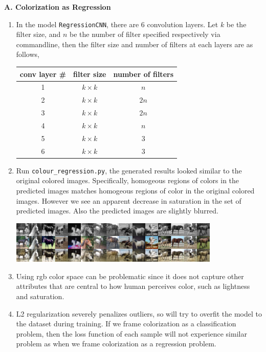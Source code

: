 \documentclass[11pt]{article}
\begin{document}
\textbf{A. Colorization as Regression}


\begin{enumerate}
    \item In the model \texttt{RegressionCNN}, there are 6 convolution layers. Let $k$ be the filter size, and $n$ be the number of filter specified respectively via commandline, then the filter size and number of filters at each layers are as follows,
    \begin{center}
        \begin{tabular}{ c | c c } 
            conv layer \# & filter size & number of filters \\ 
            \hline
            1 & $k\times k$ & $n$ \\
            2 & $k\times k$ & $2n$ \\ 
            3 & $k\times k$ & $2n$ \\ 
            4 & $k\times k$ & $n$ \\ 
            5 & $k\times k$ & $3$ \\
            6 & $k\times k$ & $3$ \\ 
           \end{tabular}
    \end{center}
    \item Run \texttt{colour\_regression.py}, the generated results looked similar to the original colored images. Specifically, homogeous regions of colors in the predicted images matches homogeous regions of color in the original colored images. However we see an apparent decrease in saturation in the set of predicted images. Also the predicted images are slightly blurred.
    \begin{center}
        \includegraphics[width=10cm]{regression_output.png}
    \end{center}
    \item Using rgb color space can be problematic since it does not capture other attributes that are central to how human perceives color, such as lightness and saturation. 
    \item L2 regularization severely penalizes outliers, so will try to overfit the model to the dataset during training. If we frame colorization as a classification problem, then the loss function of each sample will not experience similar problem as when we frame colorization as a regression problem. 
\end{enumerate}
\end{document}
